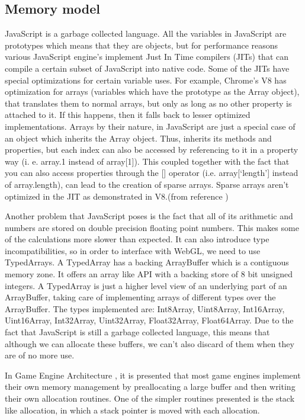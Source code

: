 \subsection{Memory model}

JavaScript is a garbage collected language. All the variables in JavaScript are prototypes which means that they are objects, but for performance reasons various JavaScript engine’s implement Just In Time compilers (JITs) that can compile a certain subset of JavaScript into native code. Some of the JITs have special optimizations for certain variable uses. For example, Chrome’s V8 has optimization for arrays (variables which have the prototype as the Array object), that translates them to normal arrays, but only as long as no other property is attached to it. If this happens, then it falls back to lesser optimized implementations. Arrays by their nature, in JavaScript are just a special case of an object which inherits the Array object. Thus, inherits its methods and properties, but each index can also be accessed by referencing to it in a property way (i. e. array.1 instead of array[1]). This coupled together with the fact that you can also access properties through the [] operator (i.e. array[‘length’] instead of array.length), can lead to the creation of sparse arrays. Sparse arrays aren’t optimized in the JIT as demonstrated in V8.(from reference \cite{clifford12})

Another problem that JavaScript poses is the fact that all of its arithmetic and numbers are stored on double precision floating point numbers. This makes some of the calculations more slower than expected. It can also introduce type incompatibilities, so in order to interface with WebGL, we need to use TypedArrays. A TypedArray has a backing ArrayBuffer which is a contiguous memory zone. It offers an array like API with a backing store of 8 bit unsigned integers. A TypedArray is just a higher level view of an underlying part of an ArrayBuffer, taking care of implementing arrays of different types over the ArrayBuffer. The types implemented are: Int8Array, Uint8Array, Int16Array, Uint16Array, Int32Array, Uint32Array, Float32Array, Float64Array. Due to the fact that  JavaScript is still a garbage collected language, this means that although we can allocate these buffers, we can’t also discard of them when they are of no more use.

In Game Engine Architecture \cite{gregory09}, it is presented that most game engines implement their own memory management by preallocating a large buffer and then writing their own allocation routines. One of the simpler routines presented is the stack like allocation, in which a stack pointer is moved with each allocation.

